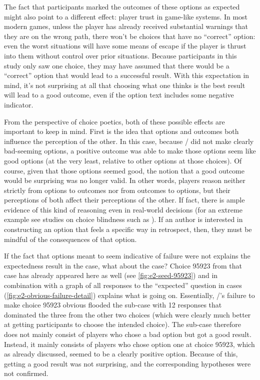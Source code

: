 The fact that participants marked the outcomes of these options as expected might also point to a different effect: player trust in game-like systems.
%
In most modern games, unless the player has already received substantial warnings that they are on the wrong path, there won't be choices that have no ``correct'' option: even the worst situations will have some means of escape if the player is thrust into them without control over prior situations.
%
Because participants in this study only saw one choice, they may have assumed that there would be a ``correct'' option that would lead to a successful result.
%
With this expectation in mind, it's not surprising at all that choosing what one thinks is the best result will lead to a good outcome, even if the option text includes some negative indicator.


From the perspective of choice poetics, both of these possible effects are important to keep in mind.
%
First is the idea that options and outcomes both influence the perception of the other.
%
In this case, because \dunyazad/ did not make clearly bad-seeming options, a positive outcome was able to make those options seem like good options (at the very least, relative to other options at those choices).
%
Of course, given that those options seemed good, the notion that a good outcome would be surprising was no longer valid.
%
In other words, players reason neither strictly from options to outcomes nor from outcomes to options, but their perceptions of both affect their perceptions of the other.
%
If fact, there is ample evidence of this kind of reasoning even in real-world decisions (for an extreme example see studies on choice blindness such as \citep{Hall2012}).
%
If an author is interested in constructing an option that feels a specific way in retrospect, then, they must be mindful of the consequences of that option.


If the fact that options meant to seem indicative of failure were not explains the expectedness result in the \unxs{} case, what about the \obvfa{} case?
%
Choice 95923 from that case has already appeared here as well (see \cref{fig:e2-seed-95923}) and in combination with a graph of all responses to the ``expected'' question in \obvfa{} cases (\cref{fig:e2-obvious-failure-detail}) explains what is going on.
%
Essentially, \dunyazad/'s failure to make choice 95923 obvious flooded the \obvfa{} sub-case with 12 responses that dominated the three from the other two choices (which were clearly much better at getting participants to choose the intended choice).
%
The \obvfa{} sub-case therefore does not mainly consist of players who chose a bad option but got a good result.
%
Instead, it mainly consists of players who chose option one at choice 95923, which as already discussed, seemed to be a clearly positive option.
%
Because of this, getting a good result was not surprising, and the corresponding hypotheses were not confirmed.


